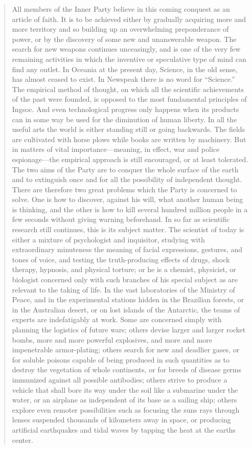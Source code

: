 \begin{quotation}
All members of the Inner Party believe in this coming conquest as an
article of faith. It is to be achieved either by gradually acquiring
more and more territory and so building up an overwhelming preponderance
of power, or by the discovery of some new and unanswerable weapon. The
search for new weapons continues unceasingly, and is one of the very few
remaining activities in which the inventive or speculative type of mind
can find any outlet. In Oceania at the present day, Science, in the old
sense, has almost ceased to exist. In Newspeak there is no word for
``Science.'' The empirical method of thought, on which all the scientific
achievements of the past were founded, is opposed to the most
fundamental principles of Ingsoc. And even technological progress only
happens when its products can in some way be used for the diminution of
human liberty. In all the useful arts the world is either standing still
or going backwards. The fields are cultivated with horse plows while
books are written by machinery. But in matters of vital
importance---meaning, in effect, war and police espionage---the
empirical approach is still encouraged, or at least tolerated. The two
aims of the Party are to conquer the whole surface of the earth and to
extinguish once and for all the possibility of independent thought.
There are therefore two great problems which the Party is concerned to
solve. One is how to discover, against his will, what another human
being is thinking, and the other is how to kill several hundred million
people in a few seconds without giving warning beforehand. In so far as
scientific research still continues, this is its subject matter. The
scientist of today is either a mixture of psychologist and inquisitor,
studying with extraordinary minuteness the meaning of facial
expressions, gestures, and tones of voice, and testing the
truth-producing effects of drugs, shock therapy, hypnosis, and physical
torture; or he is a chemist, physicist, or biologist concerned only with
such branches of his special subject as are relevant to the taking of
life. In the vast laboratories of the Ministry of Peace, and in the
experimental stations hidden in the Brazilian forests, or in the
Australian desert, or on lost islands of the Antarctic, the teams of
experts are indefatigably at work. Some are concerned simply with
planning the logistics of future wars; others devise larger and larger
rocket bombs, more and more powerful explosives, and more and more
impenetrable armor-plating; others search for new and deadlier gases, or
for soluble poisons capable of being produced in such quantities as to
destroy the vegetation of whole continents, or for breeds of disease
germs immunized against all possible antibodies; others strive to
produce a vehicle that shall bore its way under the soil like a
submarine under the water, or an airplane as independent of its base as
a sailing ship; others explore even remoter possibilities such as
focusing the sun\textquotesingle s rays through lenses suspended
thousands of kilometers away in space, or producing artificial
earthquakes and tidal waves by tapping the heat at the
earth\textquotesingle s center.


\end{quotation}
